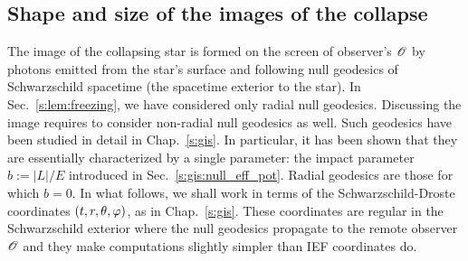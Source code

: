 \subsection{Shape and size of the images of the collapse} \label{s:lem:size_image}

The image of the collapsing star is formed on the screen of observer's $\mathscr{O}$
by photons emitted from the star's surface and following
null geodesics of Schwarzschild spacetime (the spacetime
exterior to the star). In Sec.~\ref{s:lem:freezing}, we have considered only
radial null geodesics. Discussing the image requires to consider non-radial null geodesics
as well. Such geodesics have been studied in detail in Chap.~\ref{s:gis}.
In particular, it has been shown that they are essentially characterized by a
single parameter: the impact parameter $b:=|L|/E$ introduced in Sec.~\ref{s:gis:null_eff_pot}.
Radial geodesics are those for which $b=0$.
In what follows, we shall work in terms of the Schwarzschild-Droste
coordinates $(t,r,\theta,\varphi)$, as in Chap.~\ref{s:gis}. These coordinates are regular in the Schwarzschild exterior where
the null geodesics propagate to the remote observer $\mathscr{O}$ and they
make computations slightly simpler than IEF coordinates do.

